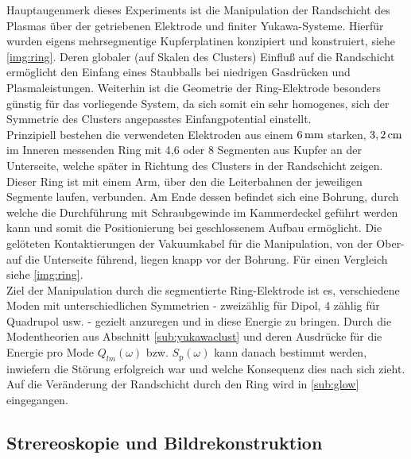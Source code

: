 \documentclass[numbers=noenddot,a4paper]{scrartcl}
\newcommand{\ix}[1]{_\text{#1}}
\begin{document}
			Hauptaugenmerk dieses Experiments ist die Manipulation der Randschicht des Plasmas \"uber der getriebenen Elektrode und finiter Yukawa-Systeme. Hierf\"ur wurden eigens mehrsegmentige Kupferplatinen konzipiert und konstruiert, siehe \ref{img:ring}. Deren globaler (auf Skalen des Clusters) Einflu{\ss} auf die Randschicht erm\"oglicht den Einfang eines Staubballs bei niedrigen Gasdr\"ucken und Plasmaleistungen. Weiterhin ist die Geometrie der Ring-Elektrode besonders g\"unstig f\"ur das vorliegende System, da sich somit ein sehr homogenes, sich der Symmetrie des Clusters angepasstes Einfangpotential einstellt.\\
			Prinzipiell bestehen die verwendeten Elektroden aus einem $\unit[6]{mm}$ starken, $\unit[3,2]{cm}$ im Inneren messenden Ring mit 4,6 oder 8 Segmenten aus Kupfer an der Unterseite, welche später in Richtung des Clusters in der Randschicht zeigen. Dieser Ring ist mit einem Arm, über den die Leiterbahnen der jeweiligen Segmente laufen, verbunden. Am Ende dessen befindet sich eine Bohrung, durch welche die Durchführung mit Schraubgewinde im Kammerdeckel geführt werden kann und somit die Positionierung bei geschlossenem Aufbau ermöglicht. Die gelöteten Kontaktierungen der Vakuumkabel für die Manipulation, von der Ober- auf die Unterseite führend, liegen knapp vor der Bohrung. Für einen Vergleich siehe \ref{img:ring}.\\
			Ziel der Manipulation durch die segmentierte Ring-Elektrode ist es, verschiedene Moden mit unterschiedlichen Symmetrien - zweizählig für Dipol, 4 zählig für Quadrupol usw. - gezielt anzuregen und in diese Energie zu bringen. Durch die Modentheorien aus Abschnitt  \ref{sub:yukawaclust} und deren Ausdrücke für die Energie pro Mode $Q_{lm}\left(\omega\right)$ bzw. $S\ix{p}\left(\omega\right)$ kann danach bestimmt werden, inwiefern die Störung erfolgreich war und welche Konsequenz dies nach sich zieht. Auf die Veränderung der Randschicht durch den Ring wird in \ref{sub:glow} eingegangen.


		\subsection{Strereoskopie und Bildrekonstruktion}
\end{document}
